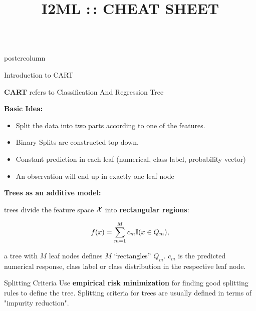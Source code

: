 \documentclass{beamer}
\title{I2ML :\,: CHEAT SHEET} %
\newlength{\columnheight} %
\begin{document}
\begin{frame}[fragile]{}
\begin{columns}
	\begin{column}{.31\textwidth}
		\begin{beamercolorbox}[center]{postercolumn}
			\begin{minipage}{.98\textwidth}
				\parbox[t][\columnheight]{\textwidth}{
					\begin{myblock}{Introduction to CART}
						\begin{codebox}
							\textbf{CART} refers to Classification And Regression Tree
						\end{codebox}

						\begin{codebox}
							\textbf{Basic Idea:}
						\end{codebox}
						\begin{itemize}[$\bullet$]     
            \setlength{\itemindent}{+.3in}
                        \item Split the data into two parts according to one of the features.
                        \item Binary Splits are constructed top-down.
                        \item Constant prediction in each leaf (numerical, class label, probability vector)
                        \item An observation will end up in exactly one leaf node
                        \end{itemize}
				
						\begin{codebox}
						\textbf{Trees as an additive model: }
						\end{codebox}
						
trees divide the feature space $\mathcal{X}$ into \textbf{rectangular regions}:

\begin{align*}
f(x) = \sum_{m=1}^M c_m \mathbb{I}(x \in Q_m),
\end{align*}

a tree with $M$ leaf nodes defines $M$ \enquote{rectangles} $Q_m$.\vspace*{1ex}
$c_m$ is the predicted numerical response, class label or class distribution in the respective leaf node.
\end{myblock}

\begin{myblock}{Splitting Criteria}
Use \textbf{empirical risk minimization} for finding good splitting rules to define the tree. Splitting criteria for trees are usually defined in terms of "impurity reduction".


\end{myblock}}
\end{minipage}
\end{beamercolorbox}
\end{column}
\end{columns}
\end{frame}
\end{document}
